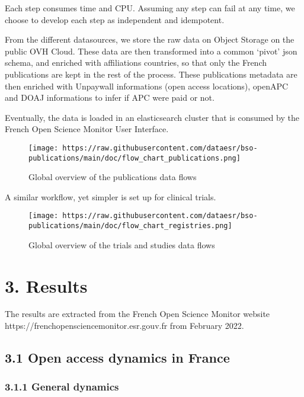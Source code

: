 \documentclass[
]{article}
\begin{document}
Each step consumes time and CPU. Assuming any step can fail at any time,
we choose to develop each step as independent and idempotent.

From the different datasources, we store the raw data on Object Storage
on the public OVH Cloud. These data are then transformed into a common
`pivot' json schema, and enriched with affiliations countries, so that
only the French publications are kept in the rest of the process. These
publications metadata are then enriched with Unpaywall informations
(open access locations), openAPC and DOAJ informations to infer if APC
were paid or not.

Eventually, the data is loaded in an elasticsearch cluster that is
consumed by the French Open Science Monitor User Interface.

\begin{figure}
\centering
\texttt{[image: https://raw.githubusercontent.com/dataesr/bso-publications/main/doc/flow\_chart\_publications.png]}
\caption{Global overview of the publications data flows}
\end{figure}

A similar workflow, yet simpler is set up for clinical trials.

\begin{figure}
\centering
\texttt{[image: https://raw.githubusercontent.com/dataesr/bso-publications/main/doc/flow\_chart\_registries.png]}
\caption{Global overview of the trials and studies data flows}
\end{figure}

\hypertarget{results}{%
\section{3. Results}\label{results}}

The results are extracted from the French Open Science Monitor website
https://frenchopensciencemonitor.esr.gouv.fr from February 2022.

\hypertarget{open-access-dynamics-in-france}{%
\subsection{3.1 Open access dynamics in
France}\label{open-access-dynamics-in-france}}

\hypertarget{general-dynamics}{%
\subsubsection{3.1.1 General dynamics}\label{general-dynamics}}
\end{document}
